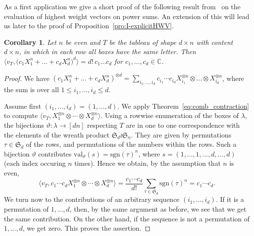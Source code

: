 \documentclass[11pt]{amsart}
\def\C{\mathbb{C}}
\def\sgn{\mathrm{sgn}}
\def\la{\lambda}
\def\ot{\otimes}
\newcommand{\aS}{\ensuremath{\mathfrak{S}}}
\newcommand{\val}{\mathrm{val}}
\numberwithin{equation}{section}
\newtheorem{corollary}[theorem]{Corollary}
\begin{document}
As a first application we give a short proof of the following result from~\cite[Thm.~3.19]{buik:15} 
on the evaluation of highest weight vectors on power sums. 
An extension of this will lead us later to the proof of Proposition~\ref{pro:I-explicitHWV}. 


\begin{corollary}\label{cor:ps-eval}
Let $n$ be even and $T$ be the tableau of shape $d\times n$ with content $d\times n$, 
in which in each row all boxes have the same letter. Then 
$\big\langle v_T, \big(c_1 X_1^n+\ldots+c_dX_d^n \big)^{d} \big\rangle = d! \, c_1\ldots c_d$
for $c_1,\ldots,c_d\in \C$. 
\end{corollary}

\begin{proof} 
We have 
$(c_1 X_1^n+\ldots+c_dX_d^n)^{\ot d} = %
\sum_{i_1,\ldots,i_d} c_{i_1}\cdots c_{i_d} X_{i_1}^{\otimes n} \otimes \ldots \otimes X_{i_d}^{\otimes n}$, 
where the sum is over all $1\le i_1,\ldots,i_d\le d$. 

Assume first $(i_1,\ldots,i_d)=(1,\ldots,d)$. 
We apply Theorem~\ref{eq:comb_contraction} to compute 
$\langle v_T, X_{1}^{\otimes n} \otimes \cdots \otimes X_{d}^{\otimes n} \rangle$.
Using a rowwise enumeration of the boxes of $\la$, the bijections
$\vartheta\colon\la\to [dn]$ respecting $T$
are in one to one correspondence with the elements of the wreath product 
$\aS_d\wr \aS_n$. They are given by permutations $\tau\in\aS_d$ 
of the rows, and permutations of the numbers within the rows. 
Such a bijection $\vartheta$ contributes 
$\val_\vartheta(s)=\sgn(\tau)^n$, 
where $s=(1,\ldots,1,\ldots,d,\ldots,d)$
(each index occuring $n$ times). 
Hence we obtain, by the assumption that $n$ is even,  
$$
\langle v_T, c_1\cdots c_d X_{1}^{\otimes n} \otimes \cdots \otimes X_{d}^{\otimes n} \rangle
 = \frac{c_1\cdots c_d}{d!} \sum_{\tau\in\aS_d} \sgn(\tau)^n = c_1\cdots c_d .
$$
We turn now to the contributions of an arbitrary sequence $(i_1,\ldots,i_d)$. 
If it is a permutation of $1,\ldots,d$, then, by the same argument as before, 
we see that we get the same contribution. 
On the other hand, if the sequence is not a permutation of $1,\ldots,d$, 
we get zero. 
This proves the assertion.
\end{proof}
\end{document}
